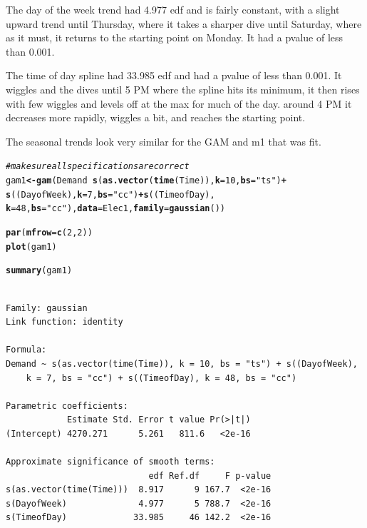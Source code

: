 \documentclass[11pt]{article}\usepackage[]{graphicx}\usepackage[]{color}
\makeatletter
\newcommand{\hlnum}[1]{\textcolor[rgb]{0,0,0}{#1}}%
\newcommand{\hlstr}[1]{\textcolor[rgb]{0,0,0}{#1}}%
\newcommand{\hlcom}[1]{\textcolor[rgb]{0.4,0.4,0.4}{\textit{#1}}}%
\newcommand{\hlopt}[1]{\textcolor[rgb]{0,0,0}{\textbf{#1}}}%
\newcommand{\hlstd}[1]{\textcolor[rgb]{0,0,0}{#1}}%
\newcommand{\hlkwb}[1]{\textcolor[rgb]{0,0,0}{\textbf{#1}}}%
\newcommand{\hlkwc}[1]{\textcolor[rgb]{0,0,0}{\textbf{#1}}}%
\newcommand{\hlkwd}[1]{\textcolor[rgb]{0,0,0}{\textbf{#1}}}%
\newenvironment{kframe}{%
 \def\at@end@of@kframe{}%
 \ifinner\ifhmode%
  \def\at@end@of@kframe{\end{minipage}}%
  \begin{minipage}{\columnwidth}%
 \fi\fi%
 \def\FrameCommand##1{\hskip\@totalleftmargin \hskip-\fboxsep
 \colorbox{shadecolor}{##1}\hskip-\fboxsep
     \hskip-\linewidth \hskip-\@totalleftmargin \hskip\columnwidth}%
 \MakeFramed {\advance\hsize-\width
   \@totalleftmargin\z@ \linewidth\hsize
   \@setminipage}}%
 {\par\unskip\endMakeFramed%
 \at@end@of@kframe}
\newenvironment{knitrout}{}{} %
\makeatother
\begin{document}
\begin{enumerate}
\begin{enumerate}
The day of the week trend had 4.977 edf and is fairly constant, with a slight upward trend until Thursday, where it takes a sharper dive until Saturday, where as it must, it returns to the starting point on Monday. It had a pvalue of less than 0.001.

The time of day spline had 33.985 edf and had a pvalue of less than 0.001. It wiggles and the dives until 5 PM where the spline hits its minimum, it then rises with few wiggles and levels off at the max for much of the day. around 4 PM it decreases more rapidly, wiggles a bit, and reaches the starting point.

The seasonal trends look very similar for the GAM and m1 that was fit.

\begin{knitrout}\footnotesize
{}\color{fgcolor}\begin{kframe}
\begin{alltt}
\hlcom{#make sure all specifications are correct}
\hlstd{gam1} \hlkwb{<-} \hlkwd{gam}\hlstd{(Demand}\hlopt{~}\hlkwd{s}\hlstd{(}\hlkwd{as.vector}\hlstd{(}\hlkwd{time}\hlstd{(Time)),}\hlkwc{k}\hlstd{=}\hlnum{10}\hlstd{,}\hlkwc{bs}\hlstd{=}\hlstr{"ts"}\hlstd{)}\hlopt{+}
              \hlkwd{s}\hlstd{((DayofWeek),}\hlkwc{k}\hlstd{=}\hlnum{7}\hlstd{,}\hlkwc{bs}\hlstd{=}\hlstr{"cc"}\hlstd{)}\hlopt{+}\hlkwd{s}\hlstd{((TimeofDay),}
      \hlkwc{k} \hlstd{=} \hlnum{48}\hlstd{,} \hlkwc{bs} \hlstd{=} \hlstr{"cc"}\hlstd{),} \hlkwc{data}\hlstd{=Elec1,} \hlkwc{family} \hlstd{=} \hlkwd{gaussian}\hlstd{())}

\hlkwd{par}\hlstd{(}\hlkwc{mfrow}\hlstd{=}\hlkwd{c}\hlstd{(}\hlnum{2}\hlstd{,}\hlnum{2}\hlstd{))}
\hlkwd{plot}\hlstd{(gam1)}

\hlkwd{summary}\hlstd{(gam1)}
\end{alltt}
\begin{verbatim}

Family: gaussian 
Link function: identity 

Formula:
Demand ~ s(as.vector(time(Time)), k = 10, bs = "ts") + s((DayofWeek), 
    k = 7, bs = "cc") + s((TimeofDay), k = 48, bs = "cc")

Parametric coefficients:
            Estimate Std. Error t value Pr(>|t|)
(Intercept) 4270.271      5.261   811.6   <2e-16

Approximate significance of smooth terms:
                            edf Ref.df     F p-value
s(as.vector(time(Time)))  8.917      9 167.7  <2e-16
s(DayofWeek)              4.977      5 788.7  <2e-16
s(TimeofDay)             33.985     46 142.2  <2e-16


\end{verbatim}
\end{kframe}
\end{knitrout}
\end{enumerate}
\end{enumerate}
\end{document}
